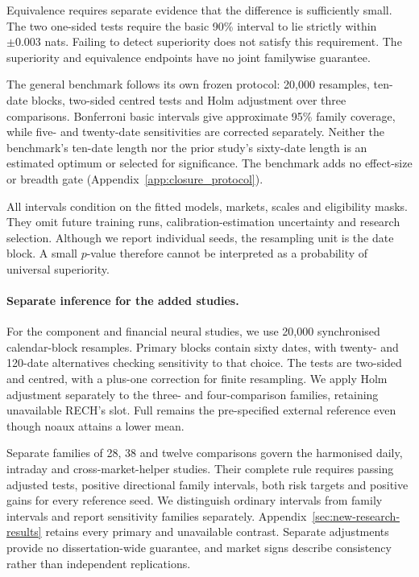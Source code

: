 Equivalence requires separate evidence that the difference is sufficiently small. The two one-sided tests require the basic 90\% interval to lie strictly within $\pm0.003$ nats. Failing to detect superiority does not satisfy this requirement. The superiority and equivalence endpoints have no joint familywise guarantee.

The general benchmark follows its own frozen protocol: 20,000 resamples, ten-date blocks, two-sided centred tests and Holm adjustment over three comparisons. Bonferroni basic intervals give approximate 95\% family coverage, while five- and twenty-date sensitivities are corrected separately. Neither the benchmark's ten-date length nor the prior study's sixty-date length is an estimated optimum or selected for significance. The benchmark adds no effect-size or breadth gate (Appendix~\ref{app:closure_protocol}).

All intervals condition on the fitted models, markets, scales and eligibility masks. They omit future training runs, calibration-estimation uncertainty and research selection. Although we report individual seeds, the resampling unit is the date block. A small $p$-value therefore cannot be interpreted as a probability of universal superiority.

\paragraph{Separate inference for the added studies.}
For the component and financial neural studies, we use 20,000 synchronised calendar-block resamples. Primary blocks contain sixty dates, with twenty- and 120-date alternatives checking sensitivity to that choice. The tests are two-sided and centred, with a plus-one correction for finite resampling. We apply Holm adjustment separately to the three- and four-comparison families, retaining unavailable RECH's slot. Full remains the pre-specified external reference even though noaux attains a lower mean.

Separate families of 28, 38 and twelve comparisons govern the harmonised daily, intraday and cross-market-helper studies. Their complete rule requires passing adjusted tests, positive directional family intervals, both risk targets and positive gains for every reference seed. We distinguish ordinary intervals from family intervals and report sensitivity families separately. Appendix~\ref{sec:new-research-results} retains every primary and unavailable contrast. Separate adjustments provide no dissertation-wide guarantee, and market signs describe consistency rather than independent replications.

